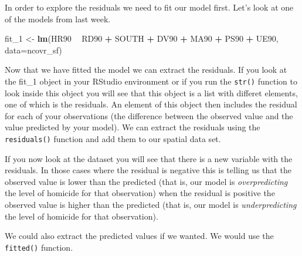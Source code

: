 \documentclass[]{book}
\newenvironment{Shaded}{\begin{snugshade}}{\end{snugshade}}
\newcommand{\DataTypeTok}[1]{\textcolor[rgb]{0.13,0.29,0.53}{#1}}
\newcommand{\DecValTok}[1]{\textcolor[rgb]{0.00,0.00,0.81}{#1}}
\newcommand{\KeywordTok}[1]{\textcolor[rgb]{0.13,0.29,0.53}{\textbf{#1}}}
\newcommand{\NormalTok}[1]{#1}
\newcommand{\OperatorTok}[1]{\textcolor[rgb]{0.81,0.36,0.00}{\textbf{#1}}}
\newcommand{\StringTok}[1]{\textcolor[rgb]{0.31,0.60,0.02}{#1}}
\begin{document}
In order to explore the residuals we need to fit our model first. Let's look at one of the models from last week.

\begin{Shaded}
\begin{Highlighting}[]
\NormalTok{fit_}\DecValTok{1}\NormalTok{ <-}\StringTok{ }\KeywordTok{lm}\NormalTok{(HR90 }\OperatorTok{~}\StringTok{ }\NormalTok{RD90 }\OperatorTok{+}\StringTok{ }\NormalTok{SOUTH }\OperatorTok{+}\StringTok{ }\NormalTok{DV90 }\OperatorTok{+}\StringTok{ }\NormalTok{MA90 }\OperatorTok{+}\StringTok{ }\NormalTok{PS90 }\OperatorTok{+}\StringTok{ }\NormalTok{UE90, }\DataTypeTok{data=}\NormalTok{ncovr_sf)}
\end{Highlighting}
\end{Shaded}

Now that we have fitted the model we can extract the residuals. If you look at the fit\_1 object in your RStudio environment or if you run the \texttt{str()} function to look inside this object you will see that this object is a list with differet elements, one of which is the residuals. An element of this object then includes the residual for each of your observations (the difference between the observed value and the value predicted by your model). We can extract the residuals using the \texttt{residuals()} function and add them to our spatial data set.

\begin{Shaded}
\end{Shaded}

If you now look at the dataset you will see that there is a new variable with the residuals. In those cases where the residual is negative this is telling us that the observed value is lower than the predicted (that is, our model is \emph{overpredicting} the level of homicide for that observation) when the residual is positive the observed value is higher than the predicted (that is, our model is \emph{underpredicting} the level of homicide for that observation).

We could also extract the predicted values if we wanted. We would use the \texttt{fitted()} function.

\begin{Shaded}
\end{Shaded}
\end{document}
